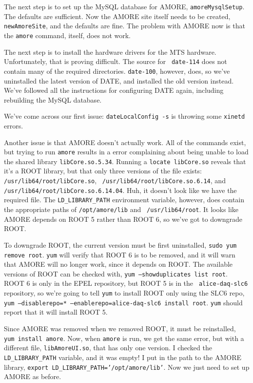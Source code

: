 \documentclass[12pt]{article}
\begin{document}
\qq The next step is to set up the MySQL database for AMORE, {\tt amoreMysqlSetup}.
The defaults are sufficient. Now the AMORE site itself needs to be created, {\tt
  newAmoreSite}, and the defaults are fine. The problem with AMORE now is that
the {\tt amore} command, itself, does not work.

\qq The next step is to install the hardware drivers for the MTS
hardware. Unfortunately, that is proving difficult. The source for {\tt
  date-114} does not contain many of the required directories. {\tt date-100},
however, does, so we've uninstalled the latest version of DATE, and installed
the old version instead. We've followed all the instructions for configuring
DATE again, including rebuilding the MySQL database.

\qq We've come across our first issue: {\tt dateLocalConfig -s} is throwing some
{\tt xinetd} errors.

\qq Another issue is that AMORE doesn't actually work. All of the commands
exist, but trying to run {\tt amore} results in a error complaining about being
unable to load the shared library {\tt libCore.so.5.34}. Running a {\tt locate
  libCore.so} reveals that it's a ROOT library, but that only three versions of
the file exists: {\tt /usr/lib64/root/libCore.so}, {\tt
  /usr/lib64/root/libCore.so.6.14}, and {\tt
  /usr/lib64/root/libCore.so.6.14.04}. Huh, it doesn't look like we have the
required file. The {\tt LD\_LIBRARY\_PATH} environment variable, however, does
contain the appropriate paths of {\tt /opt/amore/lib} and {\tt
  /usr/lib64/root}. It looks like AMORE depends on ROOT 5 rather than ROOT 6, so
we've got to downgrade ROOT.

\qq To downgrade ROOT, the current version must be first uninstalled, {\tt sudo
  yum remove root}. {\tt yum} will verify that ROOT 6 is to be removed, and it
will warn that AMORE will no longer work, since it depends on ROOT. The
available versions of ROOT can be checked with, {\tt yum --showduplicates list
  root}. ROOT 6 is only in the EPEL repository, but ROOT 5 is in the {\tt
  alice-daq-slc6} repository, so we're going to tell {\tt yum} to install ROOT
only using the SLC6 repo, {\tt yum --disablerepo=* --enablerepo=alice-daq-slc6
  install root}. {\tt yum} should report that it will install ROOT 5.

\qq Since AMORE was removed when we removed ROOT, it must be reinstalled, {\tt
  yum install amore}. Now, when {\tt amore} is run, we get the same error, but
with a different file, {\tt libAmoreUI.so}, that has only one version. I checked
the {\tt LD\_LIBRARY\_PATH} variable, and it was empty! I put in the path to the
AMORE library, {\tt export LD\_LIBRARY\_PATH='/opt/amore/lib'}. Now we just need
to set up AMORE as before.
\end{document}
